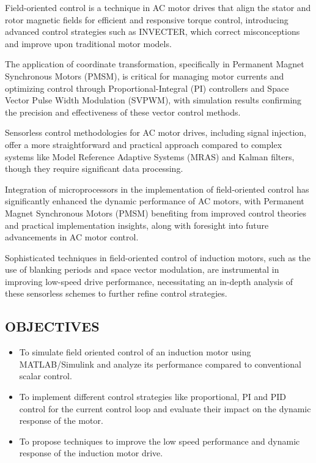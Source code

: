 \hspace{0.2in} Field-oriented control is a technique in AC motor drives that align the stator and rotor magnetic fields for efficient and responsive torque control, introducing advanced control strategies such as INVECTER, which correct misconceptions and improve upon traditional motor models.


The application of coordinate transformation, specifically in Permanent Magnet Synchronous Motors (PMSM), is critical for managing motor currents and optimizing control through Proportional-Integral (PI) controllers and Space Vector Pulse Width Modulation (SVPWM), with simulation results confirming the precision and effectiveness of these vector control methods.


Sensorless control methodologies for AC motor drives, including signal injection, offer a more straightforward and practical approach compared to complex systems like Model Reference Adaptive Systems (MRAS) and Kalman filters, though they require significant data processing.


Integration of microprocessors in the implementation of field-oriented control has significantly enhanced the dynamic performance of AC motors, with Permanent Magnet Synchronous Motors (PMSM) benefiting from improved control theories and practical implementation insights, along with foresight into future advancements in AC motor control.


Sophisticated techniques in field-oriented control of induction motors, such as the use of blanking periods and space vector modulation, are instrumental in improving low-speed drive performance, necessitating an in-depth analysis of these sensorless schemes to further refine control strategies.

\subsection{OBJECTIVES}
\begin{itemize}
	\item To simulate field oriented control of an induction motor using MATLAB/Simulink and analyze its performance compared to conventional scalar control.
	\item To implement different control strategies like proportional, PI and PID control for the current control loop and evaluate their impact on the dynamic response of the motor.

	\item To propose techniques to improve the low speed performance and dynamic response of the induction motor drive.
\end{itemize}

